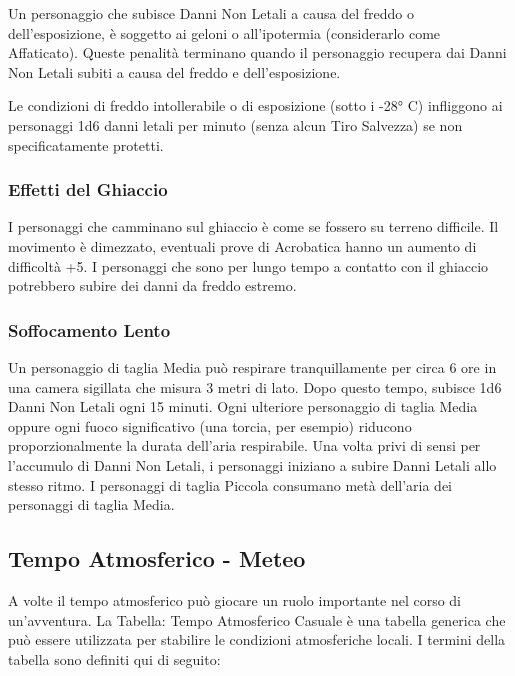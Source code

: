 \documentclass[a4paper,11pt,twoside,openany]{book}
\begin{document}
Un personaggio che subisce Danni Non Letali a causa del freddo o dell'esposizione, è soggetto ai geloni o all'ipotermia (considerarlo come Affaticato). Queste penalità terminano quando il personaggio recupera dai Danni Non Letali subiti a causa del freddo e dell'esposizione.

Le condizioni di freddo intollerabile o di esposizione (sotto i -28° C) infliggono ai personaggi 1d6 danni letali per minuto (senza alcun Tiro Salvezza) se non specificatamente protetti.

\subsubsection{Effetti del Ghiaccio}

I personaggi che camminano sul ghiaccio è come se fossero su terreno difficile. Il movimento è dimezzato, eventuali prove di Acrobatica hanno un aumento di difficoltà +5. I personaggi che sono per lungo tempo a contatto con il ghiaccio potrebbero subire dei danni da freddo estremo.

\subsubsection{Soffocamento Lento}

Un personaggio di taglia Media può respirare tranquillamente per circa 6 ore in una camera sigillata che misura 3 metri di lato. Dopo questo tempo, subisce 1d6 Danni Non Letali ogni 15 minuti. Ogni ulteriore personaggio di taglia Media oppure ogni fuoco significativo (una torcia, per esempio) riducono proporzionalmente la durata dell'aria respirabile. Una volta privi di sensi per l'accumulo di Danni Non Letali, i personaggi iniziano a subire Danni Letali allo stesso ritmo. I personaggi di taglia Piccola consumano metà dell'aria dei personaggi di taglia Media.

\pagebreak

\subsection{Tempo Atmosferico - Meteo}

\label{tempo-atmosferico---meteo}

A volte il tempo atmosferico può giocare un ruolo importante nel corso di un'avventura. La Tabella: Tempo Atmosferico Casuale è una tabella generica che può essere utilizzata per stabilire le condizioni atmosferiche locali. I termini della tabella sono definiti qui di seguito:
\end{document}

